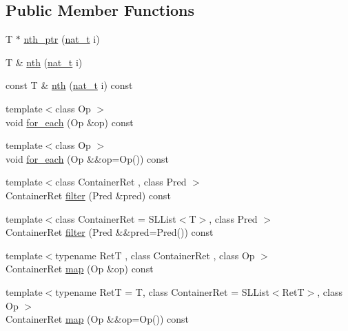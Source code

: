 \subsection*{Public Member Functions}
\begin{DoxyCompactItemize}
\item 
T $\ast$ \hyperlink{class_designar_1_1_container_algorithms_ae05e29e77ab6d57f7ae5e263bec475c6}{nth\+\_\+ptr} (\hyperlink{namespace_designar_aa72662848b9f4815e7bf31a7cf3e33d1}{nat\+\_\+t} i)
\item 
T \& \hyperlink{class_designar_1_1_container_algorithms_a519e813f4b2e787dfb7d743910ad3e4b}{nth} (\hyperlink{namespace_designar_aa72662848b9f4815e7bf31a7cf3e33d1}{nat\+\_\+t} i)
\item 
const T \& \hyperlink{class_designar_1_1_container_algorithms_aaf323d0085d4be2e234049b7ea77adf9}{nth} (\hyperlink{namespace_designar_aa72662848b9f4815e7bf31a7cf3e33d1}{nat\+\_\+t} i) const
\item 
{\footnotesize template$<$class Op $>$ }\\void \hyperlink{class_designar_1_1_container_algorithms_a32b1ccc6fc97faf17064b55e9224ba32}{for\+\_\+each} (Op \&op) const
\item 
{\footnotesize template$<$class Op $>$ }\\void \hyperlink{class_designar_1_1_container_algorithms_a5fc63764f264b91fd45fd275ecc0f27a}{for\+\_\+each} (Op \&\&op=Op()) const
\item 
{\footnotesize template$<$class Container\+Ret , class Pred $>$ }\\Container\+Ret \hyperlink{class_designar_1_1_container_algorithms_a8fde0ef12e4287386eccf48c381b7fca}{filter} (Pred \&pred) const
\item 
{\footnotesize template$<$class Container\+Ret  = S\+L\+List$<$\+T$>$, class Pred $>$ }\\Container\+Ret \hyperlink{class_designar_1_1_container_algorithms_a9ee9df4da794711c3639a3c86d905443}{filter} (Pred \&\&pred=Pred()) const
\item 
{\footnotesize template$<$typename RetT , class Container\+Ret , class Op $>$ }\\Container\+Ret \hyperlink{class_designar_1_1_container_algorithms_a3b9044a197e4ceec6a1de03de197a293}{map} (Op \&op) const
\item 
{\footnotesize template$<$typename RetT  = T, class Container\+Ret  = S\+L\+List$<$\+Ret\+T$>$, class Op $>$ }\\Container\+Ret \hyperlink{class_designar_1_1_container_algorithms_a9c49c11af28a3093dd133b65a115853b}{map} (Op \&\&op=Op()) const

\end{DoxyCompactItemize}
